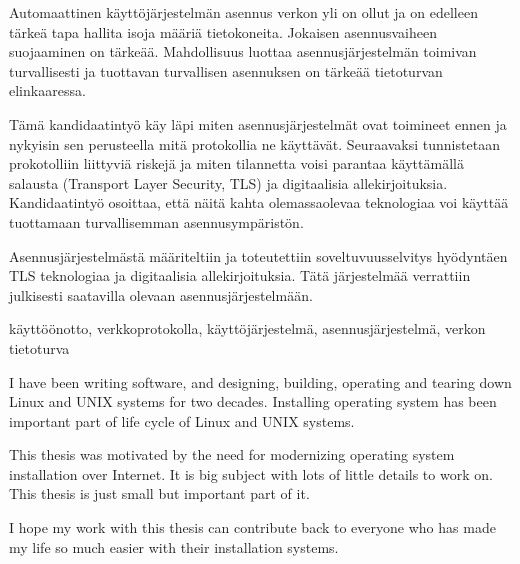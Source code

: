 \documentclass[a4paper,12pt,titlepage]{dithesis}
\begin{document}
\begin{tiivistelma}

Automaattinen käyttöjärjestelmän asennus verkon yli on ollut ja on
edelleen tärkeä tapa hallita isoja määriä tietokoneita. Jokaisen
asennusvaiheen suojaaminen on tärkeää. Mahdollisuus luottaa
asennusjärjestelmän toimivan turvallisesti ja tuottavan turvallisen
asennuksen on tärkeää tietoturvan elinkaaressa.

Tämä kandidaatintyö käy läpi miten asennusjärjestelmät ovat toimineet
ennen ja nykyisin sen perusteella mitä protokollia ne
käyttävät. Seuraavaksi tunnistetaan prokotolliin liittyviä riskejä ja
miten tilannetta voisi parantaa käyttämällä salausta (Transport Layer
Security, TLS) ja digitaalisia allekirjoituksia. Kandidaatintyö
osoittaa, että näitä kahta olemassaolevaa teknologiaa voi käyttää
tuottamaan turvallisemman asennusympäristön.

Asennusjärjestelmästä määriteltiin ja toteutettiin soveltuvuusselvitys
hyödyntäen TLS teknologiaa ja digitaalisia allekirjoituksia. Tätä
järjestelmää verrattiin julkisesti saatavilla olevaan
asennusjärjestelmään.

\avainsanat käyttöönotto, verkkoprotokolla, käyttöjärjestelmä, asennusjärjestelmä, verkon tietoturva
\end{tiivistelma}


\sisluettelo

I have been writing software, and designing, building, operating and
tearing down Linux and UNIX systems for two decades. Installing
operating system has been important part of life cycle of Linux and
UNIX systems.

This thesis was motivated by the need for modernizing operating system
installation over Internet. It is big subject with lots of little
details to work on. This thesis is just small but important part of
it.

I hope my work with this thesis can contribute back to everyone who
has made my life so much easier with their installation systems.
\end{document}
